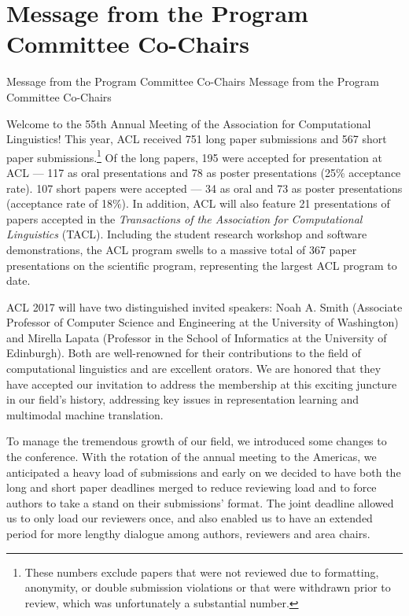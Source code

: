 \section{Message from the Program Committee Co-Chairs}\vspace{2em}
\setheaders%
    {Message from the Program Committee Co-Chairs}%
    {Message from the Program Committee Co-Chairs}
\thispagestyle{emptyheader}

\setlength{\parskip}{.7ex}

Welcome to the 55th Annual Meeting of the Association for
Computational Linguistics! This year, ACL received 751 long paper
submissions and 567 short paper submissions.\footnote{These numbers
  exclude papers that were not reviewed due to formatting, anonymity,
  or double submission violations or that were withdrawn prior to
  review, which was unfortunately a substantial number.} Of the long
papers, 195 were accepted for presentation at ACL — 117 as oral
presentations and 78 as poster presentations (25\% acceptance rate).
107 short papers were accepted — 34 as oral and 73 as poster
presentations (acceptance rate of 18\%). In addition, ACL will also
feature 21 presentations of papers accepted in the {\it Transactions
  of the Association for Computational Linguistics} (TACL). Including
the student research workshop and software demonstrations, the ACL
program swells to a massive total of 367 paper presentations on the
scientific program, representing the largest ACL program to date.

ACL 2017 will have two distinguished invited speakers: Noah A. Smith
(Associate Professor of Computer Science and Engineering at the
University of Washington) and Mirella Lapata (Professor in the School
of Informatics at the University of Edinburgh).  Both are
well-renowned for their contributions to the field of computational
linguistics and are excellent orators.  We are honored that they have
accepted our invitation to address the membership at this exciting
juncture in our field's history, addressing key issues in
representation learning and multimodal machine translation.

To manage the tremendous growth of our field, we introduced some
changes to the conference. With the rotation of the annual meeting to
the Americas, we anticipated a heavy load of submissions and early on
we decided to have both the long and short paper deadlines merged to
reduce reviewing load and to force authors to take a stand on their
submissions' format.  The joint deadline allowed us to only load our
reviewers once, and also enabled us to have an extended period for
more lengthy dialogue among authors, reviewers and area chairs.  

